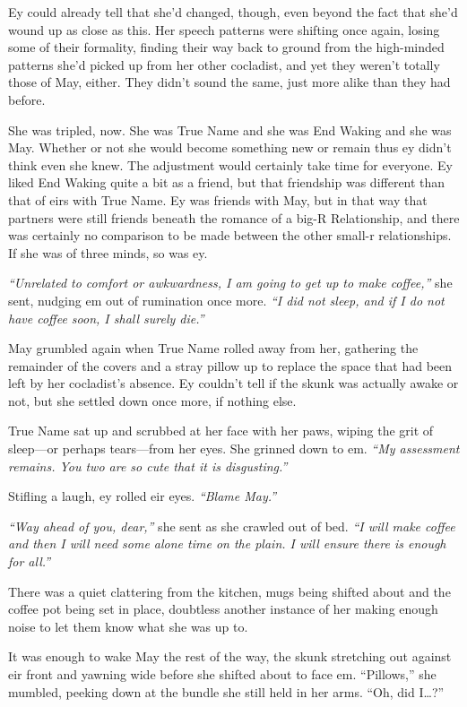 Ey could already tell that she'd changed, though, even beyond the fact that she'd wound up as close as this. Her speech patterns were shifting once again, losing some of their formality, finding their way back to ground from the high-minded patterns she'd picked up from her other cocladist, and yet they weren't totally those of May, either. They didn't sound the same, just more alike than they had before.

She was tripled, now. She was True Name and she was End Waking and she was May. Whether or not she would become something new or remain thus ey didn't think even she knew. The adjustment would certainly take time for everyone. Ey liked End Waking quite a bit as a friend, but that friendship was different than that of eirs with True Name. Ey was friends with May, but in that way that partners were still friends beneath the romance of a big-R Relationship, and there was certainly no comparison to be made between the other small-r relationships. If she was of three minds, so was ey.

\emph{``Unrelated to comfort or awkwardness, I am going to get up to make coffee,''} she sent, nudging em out of rumination once more. \emph{``I did not sleep, and if I do not have coffee soon, I shall surely die.''}

May grumbled again when True Name rolled away from her, gathering the remainder of the covers and a stray pillow up to replace the space that had been left by her cocladist's absence. Ey couldn't tell if the skunk was actually awake or not, but she settled down once more, if nothing else.

True Name sat up and scrubbed at her face with her paws, wiping the grit of sleep—or perhaps tears—from her eyes. She grinned down to em. \emph{``My assessment remains. You two are so cute that it is disgusting.''}

Stifling a laugh, ey rolled eir eyes. \emph{``Blame May.''}

\emph{``Way ahead of you, dear,''} she sent as she crawled out of bed. \emph{``I will make coffee and then I will need some alone time on the plain. I will ensure there is enough for all.''}

There was a quiet clattering from the kitchen, mugs being shifted about and the coffee pot being set in place, doubtless another instance of her making enough noise to let them know what she was up to.

It was enough to wake May the rest of the way, the skunk stretching out against eir front and yawning wide before she shifted about to face em. ``Pillows,'' she mumbled, peeking down at the bundle she still held in her arms. ``Oh, did I\ldots?''

